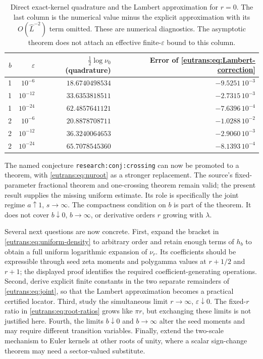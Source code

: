 \begin{table}[tbp]
\centering\small
\begin{tabular}{rrrr}
\hline
$b$ & $\varepsilon$ & $\tfrac12\log\nu_0$ (quadrature)
 & Error of \eqref{eutrans:eq:Lambert-correction}\\
\hline
1 & $10^{-6}$  & $18.6740498534$ & $-9.5251\,10^{-3}$\\
1 & $10^{-12}$ & $33.6353818511$ & $-2.7315\,10^{-3}$\\
1 & $10^{-24}$ & $62.4857641121$ & $-7.6396\,10^{-4}$\\
2 & $10^{-6}$  & $20.8878708711$ & $-1.0288\,10^{-2}$\\
2 & $10^{-12}$ & $36.3240064653$ & $-2.9060\,10^{-3}$\\
2 & $10^{-24}$ & $65.7078545360$ & $-8.1393\,10^{-4}$\\
\hline
\end{tabular}
\caption{Direct exact-kernel quadrature and the Lambert approximation
for $r=0$. The last column is the numerical value minus the explicit
approximation with its $O(\widehat L^{-2})$ term omitted. These are
numerical diagnostics. The asymptotic theorem does not attach an
effective finite-$\varepsilon$ bound to this column.}
\label{eutrans:tab:diagnostics}
\end{table}

The named conjecture \texttt{research:conj:crossing} can now be
promoted to a theorem, with \eqref{eutrans:eq:nuroot} as a stronger
replacement. The source's fixed-parameter fractional theorem and
one-crossing theorem remain valid; the present result supplies the
missing uniform estimate. Its role is specifically the joint regime
$a\uparrow1$, $s\to\infty$. The compactness condition on $b$ is part
of the theorem. It does not cover $b\downarrow0$, $b\to\infty$, or
derivative orders $r$ growing with $\lambda$.

Several next questions are now concrete. First, expand the bracket in
\eqref{eutrans:eq:uniform-density} to arbitrary order and retain enough
terms of $h_b$ to obtain a full uniform logarithmic expansion of
$\nu_r$. Its coefficients should be expressible through seed zeta
moments and polygamma values at $r+1/2$ and $r+1$; the displayed
proof identifies the required coefficient-generating operations.
Second, derive explicit finite constants in the two separate
remainders of \eqref{eutrans:eq:joint}, so that the Lambert approximation
becomes a practical certified locator. Third, study the simultaneous
limit $r\to\infty$, $\varepsilon\downarrow0$. The fixed-$r$ ratio
in \eqref{eutrans:eq:root-ratios} grows like $\pi r$, but exchanging
these limits is not justified here. Fourth, the limits $b\downarrow0$
and $b\to\infty$ alter the seed moments and may require different
transition variables. Finally, extend the two-scale mechanism to
Euler kernels at other roots of unity, where a scalar sign-change
theorem may need a sector-valued substitute.
